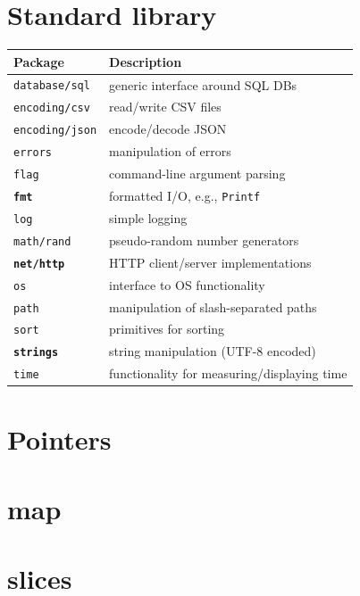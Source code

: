 \documentclass{article}
\begin{document}
\begin{multicols*}{3}
  \filbreak
  \section*{Standard library}

  \begin{tabular}{p{0.8in}p{2.2in}}
    \toprule
    \textbf{Package} & \textbf{Description} \\
    \midrule
    \texttt{database/sql} & generic interface around SQL DBs \\
    \texttt{encoding/csv} & read/write CSV files \\
    \texttt{encoding/json} & encode/decode JSON \\
    \texttt{errors} & manipulation of errors \\
    \texttt{flag} & command-line argument parsing \\
    \textbf{\texttt{fmt}} & formatted I/O, e.g., \texttt{Printf} \\
    \texttt{log} & simple logging\\
    \texttt{math/rand} & pseudo-random number generators \\
    \textbf{\texttt{net/http}} & HTTP client/server implementations \\
    \texttt{os} & interface to OS functionality \\
    \texttt{path} & manipulation of slash-separated paths \\
    \texttt{sort} & primitives for sorting \\
    \textbf{\texttt{strings}} & string manipulation (UTF-8 encoded) \\
    \texttt{time} & functionality for measuring/displaying time \\
    \bottomrule
  \end{tabular}

  \filbreak
  \section*{Pointers}

  \filbreak
  \section*{map}

  \filbreak
  \section*{slices}


\end{multicols*}
\end{document}
